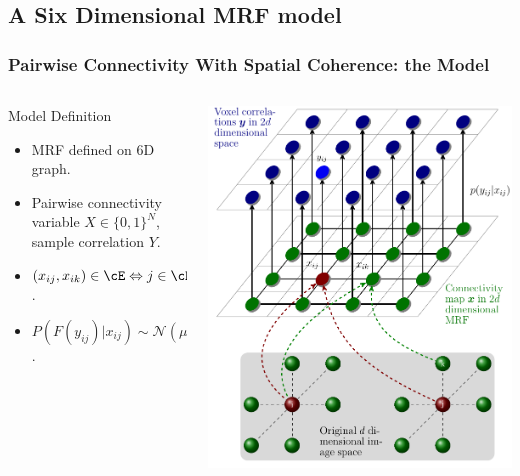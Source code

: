 \documentclass[sansserif, 10pt]{beamer}
\begin{document}
\subsection{A Six Dimensional MRF model}
\begin{frame}
\frametitle{Pairwise Connectivity With Spatial Coherence: the Model}
  \begin{columns}
    \begin{column}{0.45\textwidth}
      \begin{block}{Model Definition}
        \begin{itemize}
        \item MRF defined on 6D graph.
        \item Pairwise connectivity variable $X\in \{0, 1\}^N$, sample correlation $Y$. 
        \item $(x_{ij}, x_{ik}) \in \cE \Leftrightarrow j\in \cN(k)$.
          \item $ P(F(y_{ij}) |x_{ij}) \sim \mathcal{N}(\mu, \sigma^2)$.
        \end{itemize}
      \end{block}
    \end{column}
    \begin{column}{0.55\textwidth}
      \includegraphics[width=\textwidth]{sfig/6dmrf}
    \end{column}
    \end{columns}
\end{frame}
\end{document}
